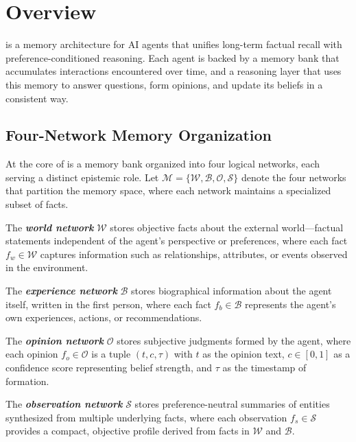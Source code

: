 \section{\our Overview}
\label{sec:hindsight-overview}

\our is a memory architecture for AI agents that unifies long-term factual recall with preference-conditioned reasoning. Each agent is backed by a memory bank that accumulates interactions encountered over time, and a reasoning layer that uses this memory to answer questions, form opinions, and update its beliefs in a consistent way. 

\subsection{Four-Network Memory Organization}

At the core of \our is a memory bank organized into four logical networks, each serving a distinct epistemic role. Let $\mathcal{M} = \{\mathcal{W}, \mathcal{B}, \mathcal{O}, \mathcal{S}\}$ denote the four networks that partition the memory space, where each network maintains a specialized subset of facts. 

The \textbf{\textit{world network}} $\mathcal{W}$ stores objective facts about the external world---factual statements independent of the agent's perspective or preferences, where each fact $f_w \in \mathcal{W}$ captures information such as relationships, attributes, or events observed in the environment. 

The \textbf{\textit{experience network}} $\mathcal{B}$ stores biographical information about the agent itself, written in the first person, where each fact $f_b \in \mathcal{B}$ represents the agent's own experiences, actions, or recommendations. 

The \textbf{\textit{opinion network}} $\mathcal{O}$ stores subjective judgments formed by the agent, where each opinion $f_o \in \mathcal{O}$ is a tuple $(t, c, \tau)$ with $t$ as the opinion text, $c \in [0,1]$ as a confidence score representing belief strength, and $\tau$ as the timestamp of formation. 

The \textbf{\textit{observation network}} $\mathcal{S}$ stores preference-neutral summaries of entities synthesized from multiple underlying facts, where each observation $f_s \in \mathcal{S}$ provides a compact, objective profile derived from facts in $\mathcal{W}$ and $\mathcal{B}$.

